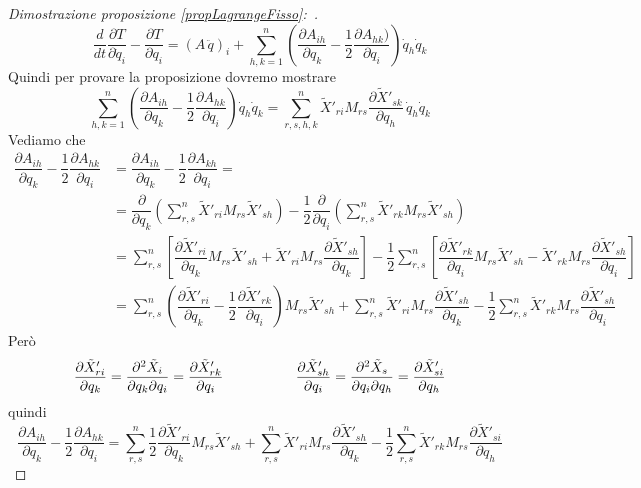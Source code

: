 \documentclass[11pt,a4paper,twoside]{book}
\newenvironment{dimo}[1][\proofname]{
	\begin{tcolorbox}[
	breakable, 
	enhanced, 
	interior hidden, 
	frame hidden, 
	borderline west = {1pt}{0pt}{gray}, 
	top=0pt, bottom=0pt, left=0pt]
\begin{proof}[#1:~]
}
{
\end{proof}
\end{tcolorbox}
}
\theoremstyle{esss}
\theoremstyle{dotless}
\numberwithin{equation}{section} %
\begin{document}
\begin{dimo}[Dimostrazione proposizione \ref{propLagrangeFisso}]
\[
\dfrac{d}{dt}\dfrac{\partial T}{\partial \dot{q}_i} - \dfrac{\partial T}{\partial q_i} = \left( A\, \ddot{q} \right)_i +\sum_{h,k=1}^n \left( \dfrac{\partial A_{ih}}{\partial q_k}  - \dfrac{1}{2} \dfrac{\partial A_{hk})}{\partial q_i} 
\right)\dot{q}_h\dot{q}_k 
\]
Quindi per provare la proposizione dovremo mostrare
\[
\sum_{h,k=1}^n \left( \dfrac{\partial A_{ih}}{\partial q_k}  - \dfrac{1}{2} \dfrac{\partial A_{hk}}{\partial q_i} 
\right)\dot{q}_h\dot{q}_k  =
\sum_{r,s,h,k}^n \tilde{X}'_{ri}M_{rs}\dfrac{\partial\tilde{X}'_{sk}}{\partial q_h} \, \dot{q}_h\dot{q}_k 
\]
Vediamo che
\begin{align*}
\dfrac{\partial A_{ih}}{\partial q_k}  - \dfrac{1}{2} \dfrac{\partial A_{hk}}{\partial q_i} &= 
\dfrac{\partial A_{ih}}{\partial q_k}  - \dfrac{1}{2} \dfrac{\partial A_{kh}}{\partial q_i} =\\
&=\dfrac{\partial}{\partial q_k} \left(
\sum_{r,s}^n \tilde{X}'_{ri} M_{rs} \tilde{X}'_{sh}
 \right) -\dfrac{1}{2}\dfrac{\partial}{\partial q_i} \left( 
\sum_{r,s}^n \tilde{X}'_{rk} M_{rs} \tilde{X}'_{sh}
 \right) \\
 & = \sum_{r,s}^n \left[\dfrac{\partial \tilde{X}'_{ri}}{\partial q_k} 
  M_{rs} \tilde{X}'_{sh}+ 
 \tilde{X}'_{ri} M_{rs}  \dfrac{\partial\tilde{X}'_{sh}}{\partial q_k} \right]
  -\dfrac{1}{2}\sum_{r,s}^n  \left[
\dfrac{\partial\tilde{X}'_{rk}}{\partial q_i} M_{rs} \tilde{X}'_{sh}
- \tilde{X}'_{rk} M_{rs} \dfrac{\partial\tilde{X}'_{sh}}{\partial q_i}
 \right]\\ 
&= \sum_{r,s}^n \left( \dfrac{\partial \tilde{X}'_{ri}}{\partial q_k} 
 -\dfrac{1}{2}\dfrac{\partial\tilde{X}'_{rk}}{\partial q_i} \right) M_{rs} \tilde{X}'_{sh} + \sum_{r,s}^n
 \tilde{X}'_{ri} M_{rs}  \dfrac{\partial\tilde{X}'_{sh}}{\partial q_k}  -\dfrac{1}{2}\sum_{r,s}^n \tilde{X}'_{rk} M_{rs} \dfrac{\partial\tilde{X}'_{sh}}{\partial q_i}
\end{align*}
Però
\[
\dfrac{\partial \tilde{X}'_{ri}}{\partial q_k}=\dfrac{\partial^2 \tilde{X}_{i}}{\partial q_k \partial q_i}= \dfrac{\partial \tilde{X}'_{rk}}{\partial q_i}
\hspace{0.15\linewidth}
\dfrac{\partial \tilde{X}'_{sh}}{\partial q_i}=\dfrac{\partial^2 \tilde{X}_{s}}{\partial q_i \partial q_h}= \dfrac{\partial \tilde{X}'_{si}}{\partial q_h}
\]
quindi
\[
\dfrac{\partial A_{ih}}{\partial q_k}  - \dfrac{1}{2} \dfrac{\partial A_{hk}}{\partial q_i} =
\sum_{r,s}^n \dfrac{1}{2}\dfrac{\partial \tilde{X}'_{ri}}{\partial q_k} 
 M_{rs} \tilde{X}'_{sh} + 
 \sum_{r,s}^n
 \tilde{X}'_{ri} M_{rs}  \dfrac{\partial\tilde{X}'_{sh}}{\partial q_k}  -\dfrac{1}{2}\sum_{r,s}^n \tilde{X}'_{rk} M_{rs} \dfrac{\partial\tilde{X}'_{si}}{\partial q_h}
\]
\end{dimo}
\end{document}
